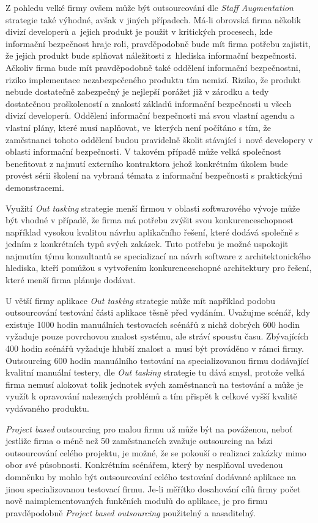 \documentclass[a4paper,12pt]{article}
\begin{document}
    Z pohledu velké firmy ovšem může být outsourcování dle \textit{Staff Augmentation} strategie také výhodné, avšak v jiných případech. Má-li obrovská firma několik divizí developerů a~jejich produkt je použit v kritických procesech, kde informační bezpečnost hraje roli, pravděpodobně bude mít firma potřebu zajistit, že jejich produkt bude splňovat náležitosti z~hlediska informační bezpečnosti. Ačkoliv firma bude mít pravděpodobně také oddělení informační bezpečnostni, riziko implementace nezabezpečeného produktu tím nemizí. Riziko, že produkt nebude dostatečně zabezpečný je nejlepší porážet již v zárodku a tedy dostatečnou proškoleností a znalostí základů informační bezpečnosti u všech divizí developerů. Oddělení informační bezpečnosti má svou vlastní agendu a vlastní plány, které musí naplňovat, ve~kterých není počítáno s tím, že zaměstnanci tohoto oddělení budou pravidelně školit stávající i~nové developery v oblasti informační bezpečnosti. V takovém případě může velká společnost benefitovat z najmutí externího kontraktora jehož konkrétním úkolem bude provést sérii školení na vybraná témata z informační bezpečnosti s praktickými demonstracemi. 

    Využití \textit{Out tasking} strategie menší firmou v oblasti softwarového vývoje může být vhodné v případě, že firma má potřebu zvýšit svou konkurenceschopnost například vysokou kvalitou návrhu aplikačního řešení, které dodává společně s jedním z konkrétních typů svých zakázek. Tuto potřebu je možné uspokojit najmutím týmu konzultantů se specializací na návrh software z architektonického hlediska, kteří pomůžou s vytvořením konkurenceschopné architektury pro řešení, které menší firma plánuje dodávat. 

    U větší firmy aplikace \textit{Out tasking} strategie může mít například podobu outsourcování testování části aplikace těsně před vydáním. Uvažujme scénář, kdy existuje 1000 hodin manuálních testovacích scénářů z nichž dobrých 600 hodin vyžaduje pouze povrchovou znalost systému, ale stráví spoustu času. Zbývajících 400 hodin scénářů vyžaduje hlubší znalost a~musí být prováděno v rámci firmy. Outsourcing 600 hodin manuálního testování na specializovanou firmu dodávající kvalitní manuální testery, dle \textit{Out tasking} strategie tu dává smysl, protože velká firma nemusí alokovat tolik jednotek svých zaměstnanců na testování a může je využít k opravování nalezených problémů a tím přispět k celkové vyšší kvalitě vydávaného produktu.

    \textit{Project based} outsourcing pro malou firmu už může být na pováženou, neboť jestliže firma o méně než 50 zaměstnancích zvažuje outsourcing na bázi outsourcování celého projektu, je možné, že se pokouší o realizaci zakázky mimo obor své působnosti. Konkrétním scénářem, který by nesplňoval uvedenou domněnku by mohlo být outsourcování celého testování dodávané aplikace na jinou specializovanou testovací firmu. Je-li měřítko dosahování cílů firmy počet nově naimplementovaných funkčních modulů do aplikace, je pro firmu pravděpodobně \textit{Project based outsourcing} použitelný a nasaditelný.
\end{document}
